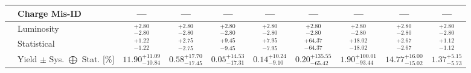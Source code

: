 \begin{tabular}{|cl||cccccc|c||c|}
\hline
&Charge Mis-ID & --- & --- & --- & --- & --- & --- & --- & ---\\ 
\hline
&Luminosity &  $^{+2.80}_{-2.80}$  &  $^{+2.80}_{-2.80}$  &  $^{+2.80}_{-2.80}$  &  $^{+2.80}_{-2.80}$  &  $^{+2.80}_{-2.80}$  &  $^{+2.80}_{-2.80}$  &  $^{+2.80}_{-2.80}$  &  $^{+2.80}_{-2.80}$ \\ 
\hline
&Statistical &  $^{+1.22}_{-1.22}$  &  $^{+2.75}_{-2.75}$  &  $^{+9.45}_{-9.45}$  &  $^{+7.95}_{-7.95}$  &  $^{+64.37}_{-64.37}$  &  $^{+18.02}_{-18.02}$  &  $^{+2.67}_{-2.67}$  &  $^{+1.12}_{-1.12}$ \\ 
\hline
\hline
&Yield $\pm$ Sys. $\bigoplus$ Stat. [\%] &  $11.90^{+11.09}_{-10.84}$  &  $0.58^{+17.70}_{-17.45}$  &  $0.05^{+14.53}_{-17.31}$  &  $0.14^{+10.24}_{-9.10}$  &  $0.20^{+135.55}_{-65.42}$  &  $1.90^{+100.01}_{-93.44}$  &  $14.77^{+16.00}_{-15.02}$  &  $1.37^{+5.15}_{-5.73}$ \\ 
\hline
\end{tabular}

